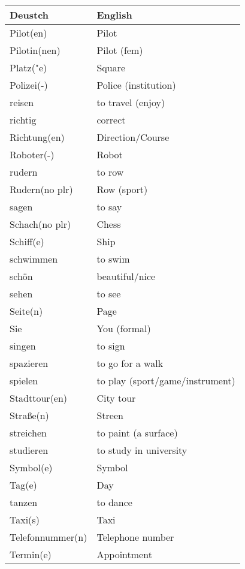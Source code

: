 \documentclass{article}
\renewcommand{\arraystretch}{1}
\begin{document}
\begin{minipage}{0.48\textwidth}
    \centering
    \renewcommand{\arraystretch}{1.5}
    \begin{tabular}{|>{\raggedright\arraybackslash}p{3.5cm}|>{\raggedright\arraybackslash}p{3.5cm}|}
        \hline
        \rowcolor{gray!20} \textbf{Deustch} & \textbf{English} \\
        \hline
        Pilot(en) & Pilot \\\hline
        Pilotin(nen) & Pilot (fem) \\\hline
        Platz("e) & Square \\\hline
        Polizei(-) & Police (institution) \\\hline
        reisen & to travel (enjoy) \\\hline
        richtig & correct \\\hline
        Richtung(en) & Direction/Course \\\hline
        Roboter(-) & Robot \\\hline
        rudern & to row \\\hline
        Rudern(no plr) & Row (sport) \\\hline
        sagen & to say \\\hline
        Schach(no plr) & Chess \\\hline
        Schiff(e) & Ship \\\hline
        schwimmen & to swim \\\hline
        schön & beautiful/nice \\\hline
        sehen & to see \\\hline
        Seite(n) & Page \\\hline
        Sie & You (formal) \\\hline
        singen & to sign \\\hline
        spazieren & to go for a walk \\\hline
        spielen & to play (sport/game/instrument) \\\hline
        Stadttour(en) & City tour \\\hline
        Stra\ss{}e(n) & Streen \\\hline
        streichen & to paint (a surface) \\\hline
        studieren & to study in university \\\hline
        Symbol(e) & Symbol \\\hline
        Tag(e) & Day \\\hline
        tanzen & to dance \\\hline
        Taxi(s) & Taxi \\\hline
        Telefonnummer(n) & Telephone number \\\hline
        Termin(e) & Appointment \\\hline
    \end{tabular}
\end{minipage}
\end{document}
